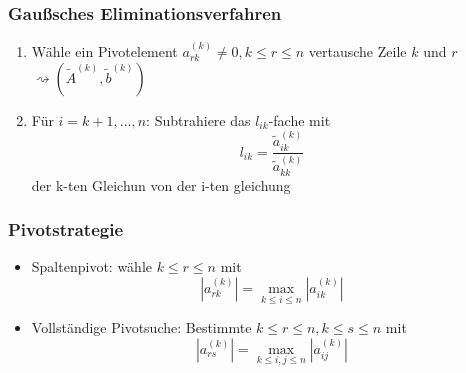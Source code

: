 \documentclass[
	ngerman,
	accentcolor=9c,%
	type=intern,
	marginpar=false
	]{tudapub}
\begin{document}
            \subsubsection{Gaußsches Eliminationsverfahren}
                \begin{enumerate}
                    \item Wähle ein Pivotelement $a^(k)_{rk} \not= 0, k\leq r\leq n$ vertausche Zeile $k$ und $r$ $\rightsquigarrow (\tilde{A}^{(k)}, \tilde{b}^{(k)}) $
                    \item Für $i=k+1, \dots, n$: 
                    Subtrahiere das $l_{ik}$-fache mit
                    \begin{equation*}
                        l_{ik} = \dfrac{\tilde{a}^{(k)}_{ik}}{\tilde{a}^{(k)}_{kk}}
                    \end{equation*}
                    der k-ten Gleichun von der i-ten gleichung
                \end{enumerate}
            \subsubsection{Pivotstrategie}
            \begin{itemize}
                \item Spaltenpivot: wähle $k\leq r \leq n$ mit 
                    \begin{equation*}
                        |a^{(k)}_{rk}| = \max_{k\leq i \leq n} |a^{(k)}_{ik}|
                    \end{equation*}
                \item  Vollständige Pivotsuche: Bestimmte $k\leq r \leq n, k\leq s \leq n$ mit 
                    \begin{equation*}
                        |a^{(k)}_{rs}| = \max_{k\leq i,j \leq n} |a^{(k)}_{ij}|
                    \end{equation*}
            \end{itemize}
\end{document}
